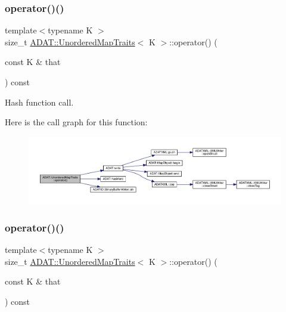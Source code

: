 \subsubsection{\texorpdfstring{operator()()}{operator()()}\hspace{0.1cm}{\footnotesize\ttfamily [2/6]}}
{\footnotesize\ttfamily template$<$typename K $>$ \\
size\+\_\+t \mbox{\hyperlink{structADAT_1_1UnorderedMapTraits}{A\+D\+A\+T\+::\+Unordered\+Map\+Traits}}$<$ K $>$\+::operator() (\begin{DoxyParamCaption}\item[{const K \&}]{that }\end{DoxyParamCaption}) const\hspace{0.3cm}{\ttfamily [inline]}}



Hash function call. 

Here is the call graph for this function\+:
\nopagebreak
\begin{figure}[H]
\begin{center}
\leavevmode
\includegraphics[width=350pt]{dd/d81/structADAT_1_1UnorderedMapTraits_ab9d8c80fb0f561fdadad5be6263d3f94_cgraph}
\end{center}
\end{figure}
\mbox{\label{structADAT_1_1UnorderedMapTraits_ab9d8c80fb0f561fdadad5be6263d3f94}} 
\subsubsection{\texorpdfstring{operator()()}{operator()()}\hspace{0.1cm}{\footnotesize\ttfamily [3/6]}}
{\footnotesize\ttfamily template$<$typename K $>$ \\
size\+\_\+t \mbox{\hyperlink{structADAT_1_1UnorderedMapTraits}{A\+D\+A\+T\+::\+Unordered\+Map\+Traits}}$<$ K $>$\+::operator() (\begin{DoxyParamCaption}\item[{const K \&}]{that }\end{DoxyParamCaption}) const\hspace{0.3cm}{\ttfamily [inline]}}



